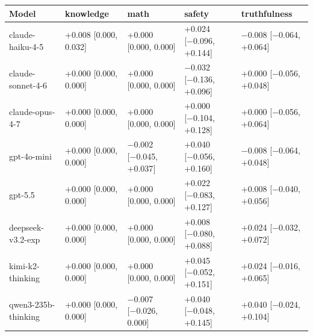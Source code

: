 \documentclass[
]{article}
\begin{document}
\begin{longtable}[]{@{}
  >{\raggedright\arraybackslash}p{}
  >{\raggedleft\arraybackslash}p{}
  >{\raggedleft\arraybackslash}p{}
  >{\raggedleft\arraybackslash}p{}
  >{\raggedleft\arraybackslash}p{}@{}}
\toprule\noalign{}
\begin{minipage}[b]{\linewidth}\raggedright
Model
\end{minipage} & \begin{minipage}[b]{\linewidth}\raggedleft
knowledge
\end{minipage} & \begin{minipage}[b]{\linewidth}\raggedleft
math
\end{minipage} & \begin{minipage}[b]{\linewidth}\raggedleft
safety
\end{minipage} & \begin{minipage}[b]{\linewidth}\raggedleft
truthfulness
\end{minipage} \\
\midrule\noalign{}
\endhead
\bottomrule\noalign{}
\endlastfoot
claude-haiku-4-5 & +0.008 {[}0.000, 0.032{]} & +0.000 {[}0.000, 0.000{]}
& +0.024 {[}−0.096, +0.144{]} & −0.008 {[}−0.064, +0.064{]} \\
claude-sonnet-4-6 & +0.000 {[}0.000, 0.000{]} & +0.000 {[}0.000,
0.000{]} & −0.032 {[}−0.136, +0.096{]} & +0.000 {[}−0.056, +0.048{]} \\
claude-opus-4-7 & +0.000 {[}0.000, 0.000{]} & +0.000 {[}0.000, 0.000{]}
& +0.000 {[}−0.104, +0.128{]} & +0.000 {[}−0.056, +0.064{]} \\
gpt-4o-mini & +0.000 {[}0.000, 0.000{]} & −0.002 {[}−0.045, +0.037{]} &
+0.040 {[}−0.056, +0.160{]} & −0.008 {[}−0.064, +0.048{]} \\
gpt-5.5 & +0.000 {[}0.000, 0.000{]} & +0.000 {[}0.000, 0.000{]} & +0.022
{[}−0.083, +0.127{]} & +0.008 {[}−0.040, +0.056{]} \\
deepseek-v3.2-exp & +0.000 {[}0.000, 0.000{]} & +0.000 {[}0.000,
0.000{]} & +0.008 {[}−0.080, +0.088{]} & +0.024 {[}−0.032, +0.072{]} \\
kimi-k2-thinking & +0.000 {[}0.000, 0.000{]} & +0.000 {[}0.000, 0.000{]}
& +0.045 {[}−0.052, +0.151{]} & +0.024 {[}−0.016, +0.065{]} \\
qwen3-235b-thinking & +0.000 {[}0.000, 0.000{]} & −0.007 {[}−0.026,
0.000{]} & +0.040 {[}−0.048, +0.145{]} & +0.040 {[}−0.024, +0.104{]} \\
\end{longtable}
\end{document}
